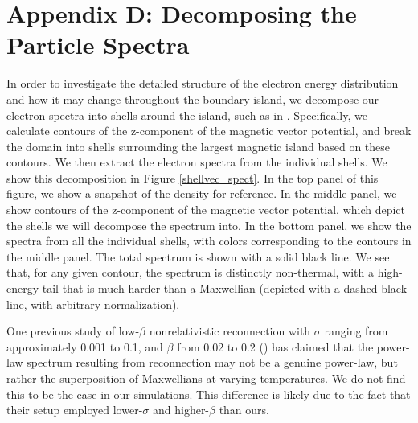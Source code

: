 \section{Appendix D: Decomposing the Particle Spectra}\label{shells}
In order to investigate the detailed structure of the electron energy distribution and how it may change throughout the boundary island, we decompose our electron spectra into shells around the island, such as in \citet{li2017}.  Specifically, we calculate contours of the z-component of the magnetic vector potential, and break the domain into shells surrounding the largest magnetic island based on these contours.  We then extract the electron spectra from the individual shells.  We show this decomposition in Figure \ref{shellvec_spect}.  In the top panel of this figure, we show a snapshot of the density for reference.  In the middle panel, we show contours of the z-component of the magnetic vector potential, which depict the shells we will decompose the spectrum into.  In the bottom panel, we show the spectra from all the individual shells, with colors corresponding to the contours in the middle panel.  The total spectrum is shown with a solid black line.  We see that, for any given contour, the spectrum is distinctly non-thermal, with a high-energy tail that is much harder than a Maxwellian (depicted with a dashed black line, with arbitrary normalization). 

One previous study of low-$\beta$ nonrelativistic reconnection with $\sigma$ ranging from approximately 0.001 to 0.1, and $\beta$ from 0.02 to 0.2 (\citealt{li2017}) has claimed that the power-law spectrum resulting from reconnection may not be a genuine power-law, but rather the superposition of Maxwellians at varying temperatures.  We do not find this to be the case in our simulations.  This difference is likely due to the fact that their setup employed lower-$\sigma$ and higher-$\beta$ than ours.

